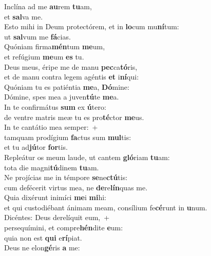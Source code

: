 \evenverse Inclína ad me \textbf{au}rem \textbf{tu}am,~\*\\
\evenverse et \textbf{sal}va me.\\
\oddverse Esto mihi in Deum protectórem, et in \textbf{lo}cum mu\textbf{ní}tum:~\*\\
\oddverse ut \textbf{sal}vum me \textbf{fá}cias.\\
\evenverse Quóniam firma\textbf{mén}tum \textbf{me}um,~\*\\
\evenverse et refúgium \textbf{me}um \textbf{es} tu.\\
\oddverse Deus meus, éripe me de manu \textbf{pec}ca\textbf{tó}ris,~\*\\
\oddverse et de manu contra legem agéntis \textbf{et} i\textbf{ní}qui:\\
\evenverse Quóniam tu es patiéntia \textbf{me}a, \textbf{Dó}mine:~\*\\
\evenverse Dómine, spes mea a juven\textbf{tú}te \textbf{me}a.\\
\oddverse In te confirmátus \textbf{sum} ex \textbf{ú}tero:~\*\\
\oddverse de ventre matris meæ tu es pro\textbf{té}ctor \textbf{me}us.\\
\evenverse In te cantátio mea semper:~+\\
\evenverse  tamquam prodígium \textbf{fa}ctus sum \textbf{mul}tis:~\*\\
\evenverse et tu ad\textbf{jú}tor \textbf{for}tis.\\
\oddverse Repleátur os meum laude, ut cantem \textbf{gló}riam \textbf{tu}am:~\*\\
\oddverse tota die magni\textbf{tú}dinem \textbf{tu}am.\\
\evenverse Ne projícias me in témpore \textbf{se}ne\textbf{ctú}tis:~\*\\
\evenverse cum defécerit virtus mea, ne \textbf{de}re\textbf{lín}quas me.\\
\oddverse Quia dixérunt inimíci \textbf{me}i \textbf{mi}hi:~\*\\
\oddverse et qui custodiébant ánimam meam, consílium fe\textbf{cé}runt in \textbf{u}num.\\
\evenverse Dicéntes: Deus derelíquit eum,~+\\
\evenverse  persequímini, et compre\textbf{hén}dite \textbf{e}um:~\*\\
\evenverse quia non est \textbf{qui} e\textbf{rí}piat.\\
\oddverse Deus ne elon\textbf{gé}ris \textbf{a} me:~\*\\

